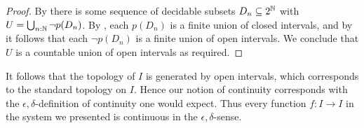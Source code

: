 \begin{proof}
  By 
  there is some sequence of decidable subsets $D_n\subseteq 2^{\mathbb{N}}$ 
  with $U = \bigcup_{n:\mathbb{N}} \neg p(D_n)$. 
  By , each $p(D_n)$ is a finite union of closed intervals, 
  and by  it follows that each $\neg p(D_n)$ is a finite union of open intervals. 
  We conclude that $U$ is a countable union of open intervals as required. 
\end{proof}
%
%

\begin{remark}\label{IntervalTopologyStandard}
  It follows that the topology of $I$ is generated by open intervals, 
  which corresponds to the standard topology on $I$. 
  Hence our notion of continuity corresponds with the $\epsilon,\delta$-definition of continuity one would expect. 
  Thus every function $f:I\to I$ in the system we presented is continuous in the $\epsilon,\delta$-sense. 
\end{remark}
